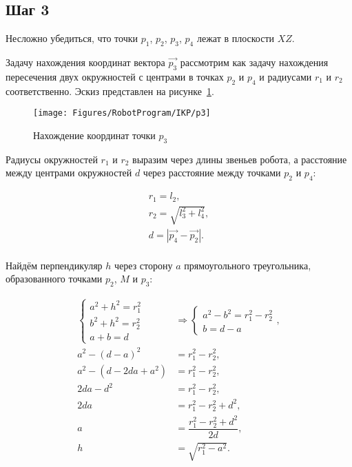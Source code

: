 \subsection*{Шаг 3}
Несложно убедиться, что точки $p_1$, $p_2$, $p_3$, $p_4$ лежат в плоскости $XZ$.

Задачу нахождения координат вектора $\overrightarrow{p_3}$ рассмотрим как задачу нахождения пересечения двух окружностей с центрами в точках $p_2$ и $p_4$ и радиусами $r_1$ и $r_2$ соответственно.
Эскиз представлен на рисунке~\ref{fig:RobotProgram:IKP:p3}.

\begin{figure}[H]
    \centering
    \vspace{14pt}
    \texttt{[image: Figures/RobotProgram/IKP/p3]}
    \caption{Нахождение координат точки $p_3$}
    \label{fig:RobotProgram:IKP:p3}
\end{figure}

Радиусы окружностей $r_1$ и $r_2$ выразим через длины звеньев робота, а расстояние между центрами окружностей $d$ через расстояние между точками $p_2$ и $p_4$:

\begin{gather*}
    r_1 = l_2, \\
    r_2 = \sqrt{l_3^2 + l_4^2}, \\
    d = \left| \overrightarrow{p_4} - \overrightarrow{p_2} \right|.
\end{gather*} \\

Найдём перпендикуляр $h$ через сторону $a$ прямоугольного треугольника, образованного точками $p_2$, $M$ и $p_3$:

\begin{align*}
    \begin{cases}
        a^2 + h^2 = r_1^2 \\
        b^2 + h^2 = r_2^2 \\
        a + b = d
    \end{cases} & \Rightarrow
    \begin{cases}
        a^2 - b^2 = r_1^2 - r_2^2 \\
        b = d - a
    \end{cases}, \\
    a^2 - \left( d - a \right)^2 &= r_1^2 - r_2^2, \\
    a^2 - \left( d - 2da + a^2 \right) &= r_1^2 - r_2^2, \\
    2da - d^2 &= r_1^2 - r_2^2, \\
    2da &= r_1^2 - r_2^2 + d^2, \\
    a &= \dfrac{r_1^2 - r_2^2 + d^2}{2d}, \\
    h &= \sqrt{r_1^2 - a^2}.
\end{align*} \\

